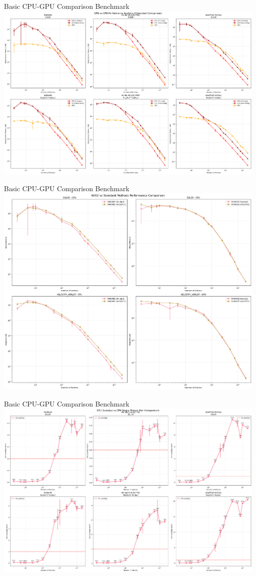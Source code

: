 \documentclass{beamer}
\begin{document}
\begin{frame}{Basic CPU-GPU Comparison Benchmark}
    \centering
    \includegraphics[width=0.99\linewidth]{figures/basic_GPU_CPU_perf.png}
\end{frame}

\begin{frame}{Basic CPU-GPU Comparison Benchmark}
    \centering
    \includegraphics[width=0.85\linewidth]{figures/basic_GPU_CPU_AVX.png}
\end{frame}

\begin{frame}{Basic CPU-GPU Comparison Benchmark}
    \centering
    \includegraphics[width=0.99\linewidth]{figures/basic_GPU_CPU_speedup.png}
\end{frame}
\end{document}
